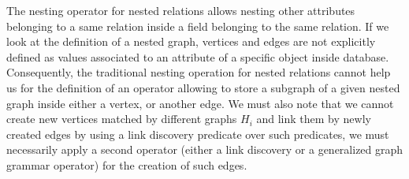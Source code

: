 The nesting operator for nested relations \cite{liu05,paredaens1992} allows nesting other attributes belonging to a same relation inside a field belonging to the same relation. If we look at the definition of a nested graph, vertices and edges are not explicitly defined as values associated to an attribute of a specific object inside database. Consequently, the traditional nesting operation for nested relations cannot help us for the definition of an operator allowing to store a subgraph of a given nested graph inside either a vertex, or another edge. We must also note that we cannot create new vertices matched by different graphs $H_i$ and link them by newly created edges by using a link discovery predicate over such predicates, we must necessarily apply a second operator (either a link discovery or a generalized graph grammar operator) for the creation of such edges.



